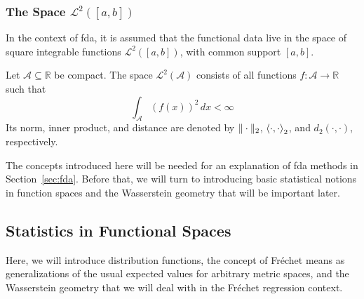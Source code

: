 \subsubsection{The Space $\mathcal{L}^2([a, b])$}
\label{sec:l2 space}
In the context of fda, it is assumed that the functional data live in
the space of square integrable functions $\mathcal{L}^2([a,b])$, with common
support $[a,b]$.
\begin{definition}
    Let $\mathcal{A} \subseteq \mathbb{R}$ be compact. The space \( \mathcal{L}^2(\mathcal{A}) \)
    consists of all functions \( f: \mathcal{A} \to \mathbb{R} \) such that
    \[
    \int_{\mathcal{A}} (f(x))^2 \, dx < \infty
    \]
    Its norm, inner product, and distance are denoted by $\|\cdot\|_2$,
    $\left \langle \cdot, \cdot \right \rangle_2$, and $d_2(\cdot, \cdot)$, respectively.
\end{definition}
The concepts introduced here will be needed for an explanation of fda methods in Section~\ref{sec:fda}.
Before that, we will turn to introducing basic statistical notions in function spaces
and the Wasserstein geometry that will be important later.

\subsection{Statistics in Functional Spaces}
\label{sec:stat_foundations}
Here, we will introduce distribution functions, the concept of Fréchet means as generalizations
of the usual expected values for arbitrary metric spaces, and the Wasserstein geometry
that we will deal with in the Fréchet regression context.

